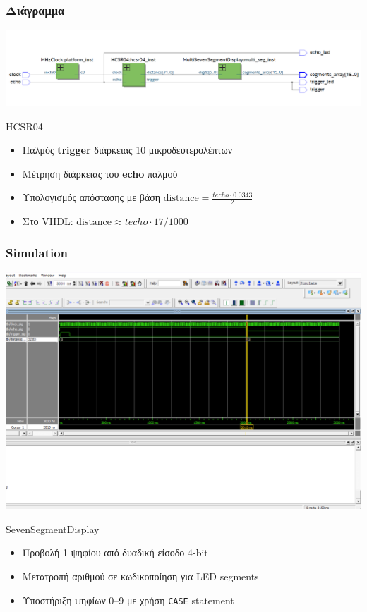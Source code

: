 \documentclass{beamer}
\begin{document}
\begin{frame}
\frametitle{Διάγραμμα}
	\centerline{\includegraphics[width=1\textwidth]{assets/echolite.png}}
\end{frame}

\begin{frame}{HCSR04}
\begin{itemize}
  \item Παλμός \textbf{trigger} διάρκειας 10 μικροδευτερολέπτων
  \item Μέτρηση διάρκειας του \textbf{echo} παλμού
  \item Υπολογισμός απόστασης με βάση $\text{distance} = \frac{techo \cdot 0.0343}{2}$
  \item Στο VHDL: $\text{distance} \approx techo \cdot 17 / 1000$
\end{itemize}
\end{frame}

\begin{frame}
\frametitle{Simulation}
	\centerline{\includegraphics[width=1\textwidth]{assets/hcsr04-tb.png}}
\end{frame}

\begin{frame}{SevenSegmentDisplay}
\begin{itemize}
  \item Προβολή 1 ψηφίου από δυαδική είσοδο 4-bit
  \item Μετατροπή αριθμού σε κωδικοποίηση για LED segments
  \item Υποστήριξη ψηφίων 0–9 με χρήση \texttt{CASE} statement
\end{itemize}
\end{frame}
\end{document}
